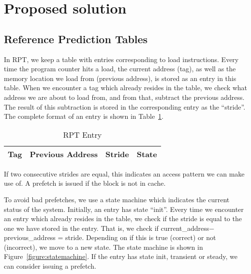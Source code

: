 \section{Proposed solution}


\subsection{Reference Prediction Tables}

In RPT, we keep a table with entries corresponding to load
instructions. Every time the program counter hits a load, the current
address (tag), as well as the memory location we load from (previous
address), is stored as an entry in this table. When we encounter a tag
which already resides in the table, we check what address we are about
to load from, and from that, subtract the previous address. The result
of this subtraction is stored in the corresponding entry as the
``stride''. The complete format of an entry is shown in
Table~\ref{table:entry}.

\begin{table}
  \centering
  \begin{tabular}{ | c | c | c | c |}
    \hline
    Tag & Previous Address & Stride & State \\ \hline
  \end{tabular}
  \caption{RPT Entry}
  \label{table:entry}
\end{table}

If two consecutive strides are equal, this indicates an access pattern
we can make use of. A prefetch is issued if the block is not in cache.

To avoid bad prefetches, we use a state machine which indicates the
current status of the system. Initially, an entry has state
``init''. Every time we encounter an entry which already resides in
the table, we check if the stride is equal to the one we have stored
in the entry. That is, we check if current\_address$ -
$previous\_address = stride. Depending on if this is true (correct) or
not (incorrect), we move to a new state. The state machine is shown in
Figure~\ref{figure:statemachine}. If the entry has state init,
transient or steady, we can consider issuing a prefetch.

